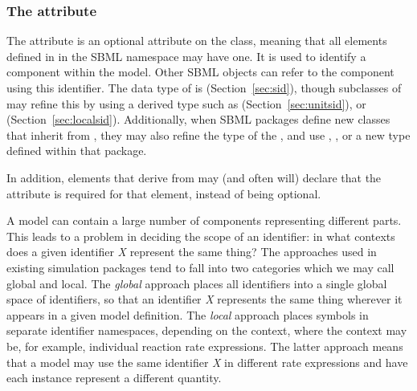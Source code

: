 \begin{blockChanged}
\subsubsection{The  attribute}
\label{sec:idnameattribs}
\label{sec:identifiers}

The  attribute is an optional attribute on the \SBase class, meaning that all elements defined in in the SBML namespace may have one.  It is used to identify a component within the model.  Other SBML objects can refer to the component using this identifier.  The data type of  is  (Section~\ref{sec:sid}), though subclasses of \SBase may refine this by using a derived type such as  (Section~\ref{sec:unitsid}), or  (Section~\ref{sec:localsid}).  Additionally, when SBML packages define new classes that inherit from \SBase, they may also refine the type of the , and use , , or a new type defined within that package.

In addition, elements that derive from \SBase may (and often will) declare that the  attribute is required for that element, instead of being optional.
\end{blockChanged}

A model can contain a large number of components representing
different parts.  This leads to a problem in deciding the scope of
an identifier: in what contexts does a given identifier \emph{X}
represent the same thing?  The approaches used in existing
simulation packages tend to fall into two categories which we may
call global and local.  The \emph{global} approach places all
identifiers into a single global space of identifiers, so that an
identifier \emph{X} represents the same thing wherever it appears
in a given model definition.  The \emph{local} approach places
symbols in separate identifier namespaces, depending on the
context, where the context may be, for example, individual
reaction rate expressions.  The latter approach means that a model
may use the same identifier \emph{X} in different rate expressions
and have each instance represent a different quantity.

